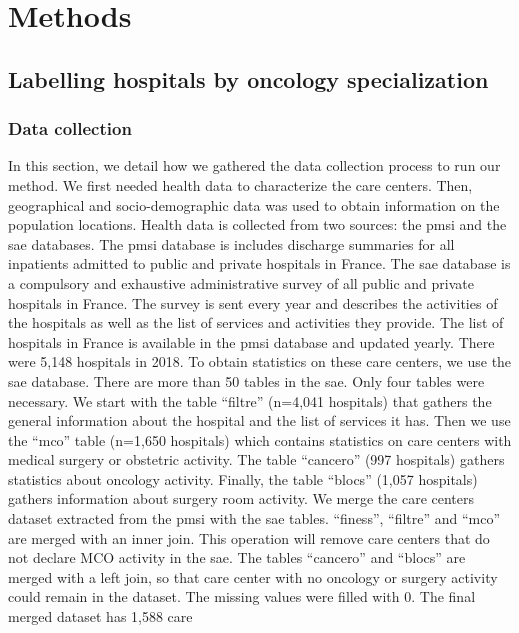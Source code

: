 \section{Methods}

\subsection{Labelling hospitals by oncology specialization}

\subsubsection{Data collection}

In this section, we detail how we gathered the data collection process to run
our method.  We first needed health data to characterize the care centers. Then,
geographical and socio-demographic data was used to obtain information on the
population locations. Health data is collected from two sources: the \ac{pmsi}
and the \ac{sae} databases. The \ac{pmsi} database is includes discharge
summaries for all inpatients admitted to public and private hospitals in France.
The \ac{sae} database is a compulsory and exhaustive administrative survey of
all public and private hospitals in France. The survey is sent every year and
describes the activities of the hospitals as well as the list of services and
activities they provide. The list of hospitals in France is available in the
\ac{pmsi} database and updated yearly. There were 5,148 hospitals in 2018. To
obtain statistics on these care centers, we use the \ac{sae} database. There are
more than 50 tables in the \ac{sae}. Only four tables were necessary. We start
with the table ``filtre'' (n=4,041 hospitals) that gathers the general
information about the hospital and the list of services it has. Then we use the
``mco'' table (n=1,650 hospitals) which contains statistics on care centers with
medical surgery or obstetric activity. The table ``cancero'' (997 hospitals)
gathers statistics about oncology activity. Finally, the table ``blocs'' (1,057
hospitals) gathers information about surgery room activity. We merge the care
centers dataset extracted from the \ac{pmsi} with the \ac{sae} tables.
``finess'', ``filtre'' and ``mco'' are merged with an inner join. This operation
will remove care centers that do not declare MCO activity in the \ac{sae}. The
tables ``cancero'' and ``blocs'' are merged with a left join, so that care
center with no oncology or surgery activity could remain in the dataset. The
missing values were filled with 0. The final merged dataset has 1,588 care

